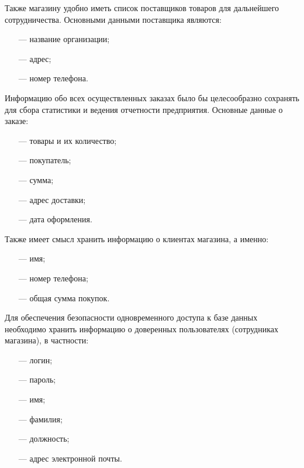 Также магазину удобно иметь список поставщиков товаров для дальнейшего сотрудничества. Основными данными поставщика являются:

\begin{itemize}[leftmargin=0.7cm +  - ]
	\item[---] название организации;
	\item[---] адрес;
	\item[---] номер телефона.
\end{itemize}

Информацию обо всех осуществленных заказах было бы целесообразно сохранять для сбора статистики и ведения отчетности предприятия. Основные данные о заказе:

\begin{itemize}[leftmargin=0.7cm +  - ]
	\item[---] товары и их количество;
	\item[---] покупатель;
	\item[---] сумма;
	\item[---] адрес доставки;
	\item[---] дата оформления.
\end{itemize}

Также имеет смысл хранить информацию о клиентах магазина, а именно:

\begin{itemize}[leftmargin=0.7cm +  - ]
	\item[---] имя;
	\item[---] номер телефона;
	\item[---] общая сумма покупок.
\end{itemize}

Для обеспечения безопасности одновременного доступа к базе данных необходимо хранить информацию о доверенных пользователях (сотрудниках магазина), в частности:

\begin{itemize}[leftmargin=0.7cm +  - ]
	\item[---] логин;
	\item[---] пароль;
	\item[---] имя;
	\item[---] фамилия;
	\item[---] должность;
	\item[---] адрес электронной почты.
\end{itemize}

\pagebreak

